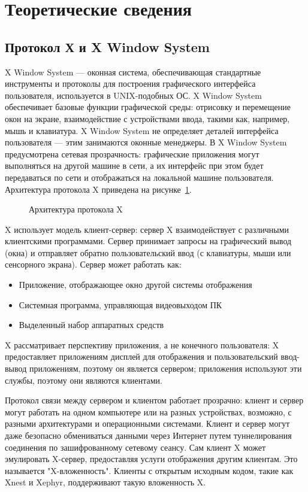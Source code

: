 \section{Теоретические сведения}
\subsection{Протокол Х и X Window System}
X Window System --- оконная система, обеспечивающая стандартные инструменты и протоколы для построения графического интерфейса пользователя, используется в UNIX-подобных ОС. X Window System обеспечивает базовые функции графической среды: отрисовку и перемещение окон на экране, взаимодействие с устройствами ввода, такими как, например, мышь и клавиатура. X Window System не определяет деталей интерфейса пользователя --- этим занимаются оконные менеджеры. В X Window System предусмотрена сетевая прозрачность: графические приложения могут выполняться на другой машине в сети, а их интерфейс при этом будет передаваться по сети и отображаться на локальной машине пользователя. Архитектура протокола X приведена на рисунке~\ref{fig:xArchitecture}.
\begin{figure}[h!]
\caption{Архитектура протокола X}
\label{fig:xArchitecture}
\end{figure}

X использует модель клиент-сервер: сервер X взаимодействует с различными клиентскими программами. Сервер принимает запросы на графический вывод (окна) и отправляет обратно пользовательский ввод (с клавиатуры, мыши или сенсорного экрана). Сервер может работать как: 
\begin{itemize}
\item Приложение, отображающее окно другой системы отображения
\item Системная программа, управляющая видеовыходом ПК
\item Выделенный набор аппаратных средств
\end{itemize}

X рассматривает перспективу приложения, а не конечного пользователя: X предоставляет приложениям дисплей для отображения и пользовательский ввод-вывод приложениям, поэтому он является сервером; приложения используют эти службы, поэтому они являются клиентами. 

Протокол связи между сервером и клиентом работает прозрачно: клиент и сервер могут работать на одном компьютере или на разных устройствах, возможно, с разными архитектурами и операционными системами. Клиент и сервер могут даже безопасно обмениваться данными через Интернет путем туннелирования соединения по зашифрованному сетевому сеансу. Сам клиент X может эмулировать X-сервер, предоставляя услуги отображения другим клиентам. Это называется "X-вложенность". Клиенты с открытым исходным кодом, такие как Xnest и Xephyr, поддерживают такую ​​вложенность X.

